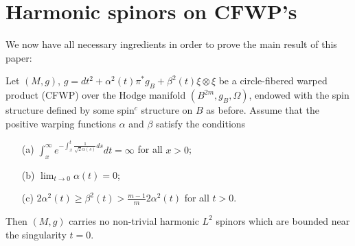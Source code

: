 \documentclass[12pt]{amsart}
\begin{document}
\section{Harmonic spinors on CFWP's}\label{sect5}

We now have all necessary ingredients in order to prove the main result 
of this paper:

\begin{theorem}\label{main}
Let $(M,g)$, $g=dt^2+{\alpha} ^2(t)\pi^*g_B+{\beta}^2(t)\xi\otimes\xi$ be a
circle-fibered warped product (CFWP) over the Hodge manifold
$(B^{2m},g_B,{\Omega})$,  
endowed with the spin structure defined by some spin$^c$ structure on
$B$ as before. 
Assume that the positive warping functions ${\alpha}$ and ${\beta}$ satisfy
the conditions
\begin{enumerate}
\item[(a)] $\displaystyle\int_x^\infty
    e^{-\int_x^t\frac{1}{\sqrt 2{\alpha}(s)}ds}dt=\infty$
for all $x>0$;
\item[(b)] $\displaystyle\lim_{t\to 0} {\alpha}(t)=0$;
\item[(c)] $\displaystyle2{\alpha}^2(t)\geq {\beta}^2(t)> \tfrac{m-1}{m}2{\alpha}^2(t)$ for all $t>0$.
\end{enumerate}
Then $(M,g)$ carries no non-trivial harmonic $L^2$ spinors which are 
bounded near the singularity $t=0$.
\end{theorem}
\end{document}
